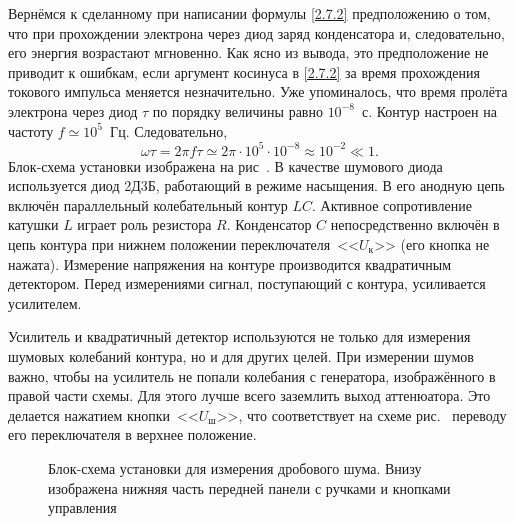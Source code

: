 Вернёмся к сделанному при написании формулы \eqref{2.7.2} предположению о том,
что при прохождении электрона через диод заряд
конденсатора и, следовательно, его энергия возрастают мгновенно. Как ясно из
вывода, это предположение не приводит к
ошибкам, если аргумент косинуса в \eqref{2.7.2} за время прохождения токового
импульса меняется незначительно. Уже
упоминалось, что время пролёта электрона через диод $\tau$ по порядку величины
равно $10^{-8}$~с. Контур настроен на
частоту $f\simeq10^5$~Гц. Следовательно,
\begin{equation*}
\omega\tau=2\pi f\tau\simeq2\pi\cdot 10^5\cdot 10^{-8}\approx10^{-2}\ll1.
\end{equation*}
\experiment
Блок-схема установки изображена на рис~. В качестве
шумового диода используется диод 2Д3Б, работающий в
режиме насыщения. В его анодную цепь включён параллельный колебательный контур
$LC$. Активное сопротивление катушки $L$
играет роль резистора $R$. Конденсатор $C$ непосредственно включён в цепь
контура при нижнем положении
переключателя~<<$U_{\text{к}}$>> (его кнопка не нажата). Измерение напряжения на
контуре производится квадратичным детектором.
Перед измерениями сигнал, поступающий с контура, усиливается усилителем.

Усилитель и квадратичный детектор используются не только для измерения шумовых
колебаний контура, но и для других целей.
При измерении шумов важно, чтобы на усилитель не попали колебания с генератора,
изображённого в правой части схемы. Для
этого лучше всего заземлить выход аттенюатора. Это делается нажатием
кнопки~<<$U_{\text{ш}}$>>, что соответствует на схеме
рис.~ переводу его переключателя в верхнее положение.

\begin{figure}[h!]
	\caption{Блок-схема установки для измерения дробового шума. Внизу изображена
нижняя часть передней панели с ручками и кнопками управления}
\end{figure}

